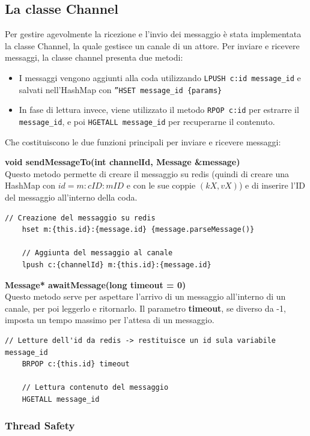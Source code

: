 \documentclass[a4paper, 11pt]{article}
\begin{document}
\subsection{La classe Channel}
Per gestire agevolmente la ricezione e l'invio dei messaggio è stata implementata la classe Channel, la quale gestisce un canale di un attore. Per inviare e ricevere messaggi, la classe channel presenta due metodi:
\begin{itemize}
    \item I messaggi vengono aggiunti alla coda utilizzando \verb|LPUSH c:id message_id| e salvati nell'HashMap con \verb|”HSET message_id {params}|
    \item In fase di lettura invece, viene utilizzato il metodo \verb|RPOP c:id| per estrarre il \verb|message_id|, e poi \verb|HGETALL message_id| per recuperarne il contenuto.
\end{itemize}
Che costituiscono le due funzioni principali per inviare e ricevere messaggi:

\textbf{void sendMessageTo(int channelId, Message \&message)}\\
Questo metodo permette di creare il messaggio su redis (quindi di creare una HashMap con $id = m:cID:mID$ e con le sue coppie $(kX,vX)$)
e di inserire l'ID del messaggio all'interno della coda.
\begin{lstlisting}[style=customcpp]
    // Creazione del messaggio su redis
    hset m:{this.id}:{message.id} {message.parseMessage()}
    
    // Aggiunta del messaggio al canale
    lpush c:{channelId} m:{this.id}:{message.id} 
\end{lstlisting}

\textbf{Message* awaitMessage(long timeout = 0)}\\
Questo metodo serve per aspettare l'arrivo di un messaggio all'interno di un canale, per poi leggerlo e ritornarlo.
Il parametro \textbf{timeout}, se diverso da -1, imposta un tempo massimo per l'attesa di un messaggio.
\begin{lstlisting}[style=customcpp]
    // Letture dell'id da redis -> restituisce un id sula variabile message_id
    BRPOP c:{this.id} timeout

    // Lettura contenuto del messaggio
    HGETALL message_id
\end{lstlisting}
\subsubsection{Thread Safety}
\end{document}
